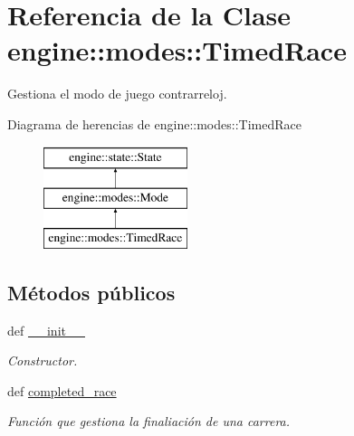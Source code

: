 \hypertarget{classengine_1_1modes_1_1TimedRace}{
\section{\-Referencia de la \-Clase engine\-:\-:modes\-:\-:\-Timed\-Race}
\label{classengine_1_1modes_1_1TimedRace}
}


\-Gestiona el modo de juego contrarreloj.  


\-Diagrama de herencias de engine\-:\-:modes\-:\-:\-Timed\-Race\begin{figure}[H]
\begin{center}
\leavevmode
\includegraphics[height=3.000000cm]{classengine_1_1modes_1_1TimedRace}
\end{center}
\end{figure}
\subsection*{\-Métodos públicos}
\begin{DoxyCompactItemize}
\item 
def \hyperlink{classengine_1_1modes_1_1TimedRace_ab407a6278a69de2077ba94604267a47f}{\-\_\-\-\_\-init\-\_\-\-\_\-}
\begin{DoxyCompactList}\small\item\em \-Constructor. \end{DoxyCompactList}\item 
def \hyperlink{classengine_1_1modes_1_1TimedRace_a973b911e88e51f53acb43ad6222fe625}{completed\-\_\-race}
\begin{DoxyCompactList}\small\item\em \-Función que gestiona la finaliación de una carrera. \end{DoxyCompactList}\end{DoxyCompactItemize}

